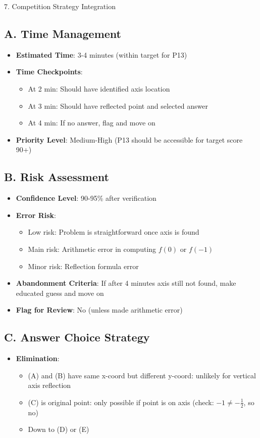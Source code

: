 \documentclass[12pt]{article}
\begin{document}
\begin{competitionbox}{7. Competition Strategy Integration}

\subsection*{A. Time Management}
\begin{itemize}[leftmargin=*]
    \item \textbf{Estimated Time}: 3-4 minutes (within target for P13)
    \item \textbf{Time Checkpoints}:
    \begin{itemize}
        \item At 2 min: Should have identified axis location
        \item At 3 min: Should have reflected point and selected answer
        \item At 4 min: If no answer, flag and move on
    \end{itemize}
    \item \textbf{Priority Level}: Medium-High (P13 should be accessible for target score 90+)
\end{itemize}

\subsection*{B. Risk Assessment}
\begin{itemize}[leftmargin=*]
    \item \textbf{Confidence Level}: 90-95\% after verification
    \item \textbf{Error Risk}: 
    \begin{itemize}
        \item Low risk: Problem is straightforward once axis is found
        \item Main risk: Arithmetic error in computing $f(0)$ or $f(-1)$
        \item Minor risk: Reflection formula error
    \end{itemize}
    \item \textbf{Abandonment Criteria}: If after 4 minutes axis still not found, make educated guess and move on
    \item \textbf{Flag for Review}: No (unless made arithmetic error)
\end{itemize}

\subsection*{C. Answer Choice Strategy}
\begin{itemize}[leftmargin=*]
    \item \textbf{Elimination}:
    \begin{itemize}
        \item (A) and (B) have same x-coord but different y-coord: unlikely for vertical axis reflection
        \item (C) is original point: only possible if point is on axis (check: $-1 \neq -\frac{1}{2}$, so no)
        \item Down to (D) or (E)
    \end{itemize}
    

\end{itemize}
\end{competitionbox}
\end{document}
